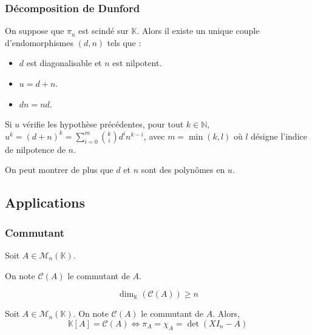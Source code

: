 	\subsubsection{Décomposition de Dunford}
	
	
	\begin{theorem}
		On suppose que $\pi_u$ est scindé sur $\mathbb{K}$. Alors il existe un unique couple d'endomorphismes $(d, n)$ tels que :
		\begin{itemize}
			\item $d$ est diagonalisable et $n$ est nilpotent.
			\item $u = d + n$.
			\item $d n = n d$.
		\end{itemize}
	\end{theorem}
	
	\begin{corollary}
		Si $u$ vérifie les hypothèse précédentes, pour tout $k \in \mathbb{N}$, $u^k = (d + n)^k = \sum_{i=0}^m \binom{k}{i} d^i n^{k-i}$, avec $m = \min(k, l)$ où $l$ désigne l'indice de nilpotence de $n$.
	\end{corollary}
	
	\begin{remark}
		On peut montrer de plus que $d$ et $n$ sont des polynômes en $u$.
	\end{remark}
	
	\subsection{Applications}
	
	\subsubsection{Commutant}
	
	
	Soit $A \in \mathcal{M}_n(\mathbb{K})$.
	
	\begin{notation}
		On note $\mathcal{C}(A)$ le commutant de $A$.
	\end{notation}
	
	\begin{lemma}
		\[ \dim_{\mathbb{K}}(\mathcal{C}(A)) \geq n \]
	\end{lemma}
	
	\begin{application}
		Soit $A \in \mathcal{M}_n(\mathbb{K})$. On note $\mathcal{C}(A)$ le commutant de $A$. Alors,
		\[ \mathbb{K}[A] = \mathcal{C}(A) \iff \pi_A = \chi_A = \det(XI_n - A) \]
	\end{application}
	
